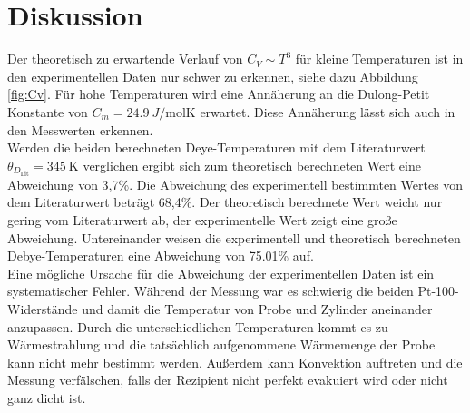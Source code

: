 \section{Diskussion}
\label{sec:Diskussion}
Der theoretisch zu erwartende Verlauf von $C_V \sim T^3$ für kleine
Temperaturen ist in den experimentellen Daten nur schwer zu erkennen, siehe dazu Abbildung \ref{fig:Cv}.
Für hohe Temperaturen wird eine Annäherung an die Dulong-Petit Konstante von
$C_m=\SI{24,9}{J\per\mol\K}$ erwartet. Diese Annäherung lässt sich auch in den
Messwerten erkennen.\\

Werden die beiden berechneten Deye-Temperaturen mit dem Literaturwert
$\theta_{D_\text{Lit}}=\SI{345}{\K}$ \cite{chemie} verglichen ergibt sich zum theoretisch berechneten
Wert eine Abweichung von 3,7\;\%. Die Abweichung des experimentell bestimmten
Wertes von dem Literaturwert beträgt 68,4\;\%.
Der theoretisch berechnete Wert weicht nur gering vom Literaturwert ab, der experimentelle
Wert zeigt eine große Abweichung. Untereinander weisen die experimentell
und theoretisch berechneten Debye-Temperaturen eine Abweichung von 75.01\;\% auf.\\
Eine mögliche Ursache für die Abweichung der experimentellen Daten ist ein systematischer Fehler.
Während der Messung war es schwierig die beiden Pt-100-Widerstände und damit die Temperatur
von Probe und Zylinder aneinander anzupassen. Durch die unterschiedlichen Temperaturen kommt
es zu Wärmestrahlung und die tatsächlich aufgenommene Wärmemenge der Probe kann nicht mehr bestimmt werden.
Außerdem kann Konvektion auftreten und die Messung verfälschen, falls der Rezipient nicht
perfekt evakuiert wird oder nicht ganz dicht ist.

